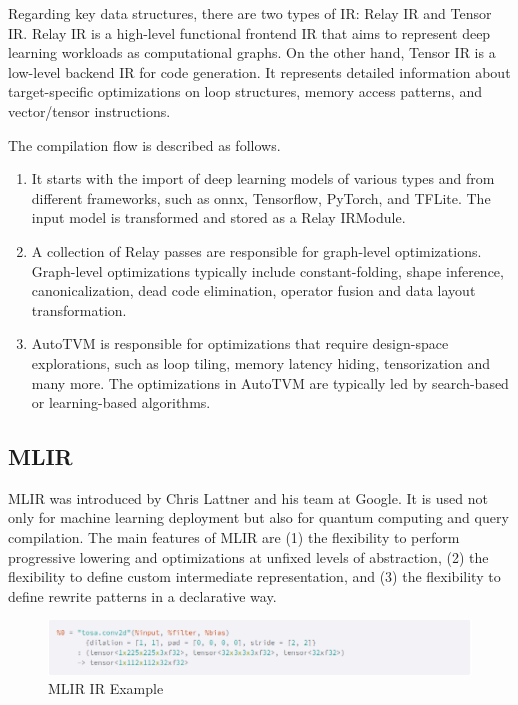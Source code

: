 Regarding key data structures, there are two types of \ac{IR}: Relay IR and Tensor IR. Relay IR is a high-level functional frontend IR that aims to represent deep learning workloads as computational graphs. On the other hand, Tensor IR is a low-level backend IR for code generation. It represents detailed information about target-specific optimizations on loop structures, memory access patterns, and vector/tensor instructions.

The compilation flow is described as follows.
\begin{enumerate}
    \item It starts with the import of deep learning models of various types and from different frameworks, such as onnx, Tensorflow, PyTorch, and TFLite. The input model is transformed and stored as a Relay IRModule.
    \item A collection of Relay passes are responsible for graph-level optimizations. Graph-level optimizations typically include constant-folding, shape inference, canonicalization, dead code elimination, operator fusion and data layout transformation.
    \item AutoTVM is responsible for optimizations that require design-space explorations, such as loop tiling, memory latency hiding, tensorization and many more. The optimizations in AutoTVM are typically led by search-based or learning-based algorithms.
\end{enumerate}

\subsection{MLIR}
MLIR was introduced by Chris Lattner and his team at Google\cite{lattner2020mlir}. It is used not only for machine learning deployment but also for quantum computing and query compilation. The main features of MLIR are (1) the flexibility to perform progressive lowering and optimizations at unfixed levels of abstraction, (2) the flexibility to define custom intermediate representation, and (3) the flexibility to define rewrite patterns in a declarative way.

\begin{figure}[ht]
    \centering
    \includegraphics[width=1.\linewidth]{figures/MLIR_IR_design.png}
    \caption{MLIR IR Example}
    \label{fig:mlir_ir_design}
\end{figure}

